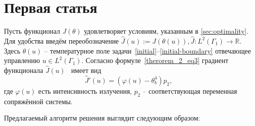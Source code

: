 \section{Первая статья}\label{sec:ch4/sec1}
Пусть функционал $J(\theta)$ удовлетворяет условиям, указанным в \autoref{sec:optimality}.
Для удобства введём переобозначение $\hat{J}(u):=J(\theta(u)), \hat{J}:L^2(\Gamma_1) \to \mathbb{R}$.
Здесь $\theta(u)$ -- температурное поле задачи~\eqref{initial}--\eqref{initial-boundary} отвечающее
управлению $u \in L^2(\Gamma_1)$.
Согласно формуле~\eqref{therorem_2_eq3} градиент функционала $\hat{J}(u)$~\cite{grenkin_13} имеет вид
\[
    \hat{J}'(u)= (\varphi(u) -\theta_b^4)p_2,
\]
где $\varphi(u)$ есть интенсивность излучения, $p_2$ -- соответствующая переменная сопряжённой системы.

Предлагаемый алгоритм решения выглядит следующим образом:


